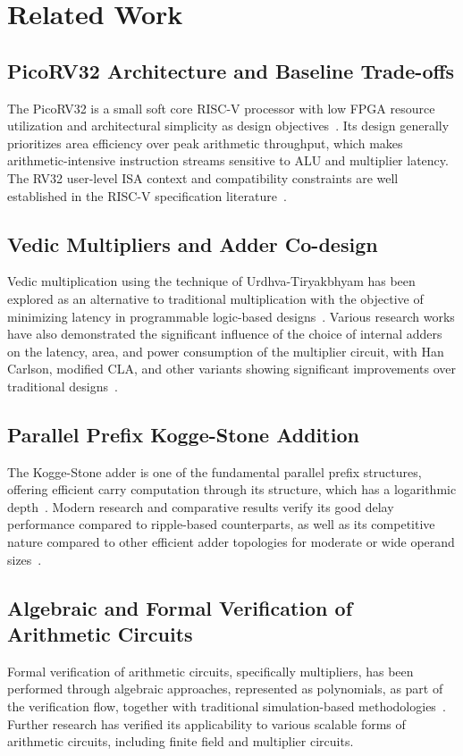 \section{Related Work}
\label{sec:related_work}

\subsection{PicoRV32 Architecture and Baseline Trade-offs}
The PicoRV32 is a small soft core RISC-V processor with low FPGA resource utilization and architectural simplicity as design objectives~\cite{picorv32_yosys,picorv32_clifford}. Its design generally prioritizes area efficiency over peak arithmetic throughput, which makes arithmetic-intensive instruction streams sensitive to ALU and multiplier latency. The RV32 user-level ISA context and compatibility constraints are well established in the RISC-V specification literature~\cite{riscv_spec,waterman2017}.

\subsection{Vedic Multipliers and Adder Co-design}
Vedic multiplication using the technique of Urdhva-Tiryakbhyam has been explored as an alternative to traditional multiplication with the objective of minimizing latency in programmable logic-based designs~\cite{mehta2014,sharma2024}. Various research works have also demonstrated the significant influence of the choice of internal adders on the latency, area, and power consumption of the multiplier circuit, with Han Carlson, modified CLA, and other variants showing significant improvements over traditional designs~\cite{kakde2014,anitha2013,priya2015}.

\subsection{Parallel Prefix Kogge-Stone Addition}
The Kogge-Stone adder is one of the fundamental parallel prefix structures, offering efficient carry computation through its structure, which has a logarithmic depth~\cite{kogge1973}. Modern research and comparative results verify its good delay performance compared to ripple-based counterparts, as well as its competitive nature compared to other efficient adder topologies for moderate or wide operand sizes~\cite{sundar2019,parhami2015}.

\subsection{Algebraic and Formal Verification of Arithmetic Circuits}
Formal verification of arithmetic circuits, specifically multipliers, has been performed through algebraic approaches, represented as polynomials, as part of the verification flow, together with traditional simulation-based methodologies~\cite{ciesielski2012}. Further research has verified its applicability to various scalable forms of arithmetic circuits, including finite field and multiplier circuits.

